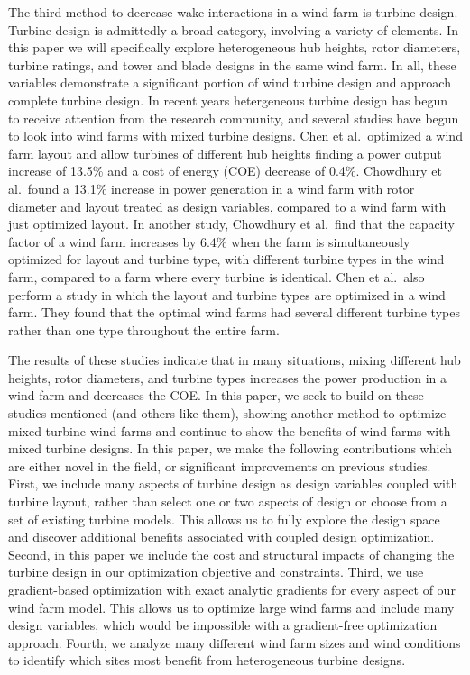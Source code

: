 The third method to decrease wake interactions in a wind farm is turbine design. Turbine design is admittedly a broad category, involving a variety of elements. In this paper we will specifically explore heterogeneous hub heights, rotor diameters, turbine ratings, and tower and blade designs in the same wind farm. In all, these variables demonstrate a significant portion of wind turbine design and approach complete turbine design. 
In recent years hetergeneous turbine design has begun to receive attention from the research community, and several studies have begun to look into wind farms with mixed turbine designs. Chen et al.~optimized
a wind farm layout and allow turbines of different hub heights finding a power output increase of 13.5\% and a cost of energy (COE) decrease of 0.4\%\cite{chen2013wind}. Chowdhury et al.~found
a 13.1\% increase in power generation in a wind farm with rotor diameter and layout treated as design variables, compared to a wind farm with just optimized layout\cite{chowdhury2010optimizing}. In another study, Chowdhury et al.~find that the capacity factor of a wind farm increases by 6.4\% when the farm is simultaneously optimized for layout and turbine type, with different turbine types in the wind farm, compared to a farm where every turbine is identical\cite{chowdhury2013optimizing}. Chen et al.~also perform a study in which the layout and turbine types are optimized in a wind farm. They found that the optimal wind farms had several different turbine types rather than one type throughout the entire farm\cite{chen2015multi}.

The results of these studies indicate that in many situations, mixing different hub heights, rotor diameters, and turbine types increases the power production in a wind farm and decreases the COE. In this paper, we seek to build on these studies mentioned (and others like them), showing another method to optimize mixed turbine wind farms and continue to show the benefits of wind farms with mixed turbine designs. In this paper, we make the following contributions which are either novel in the field, or significant improvements on previous studies.
First, we include many aspects of turbine design as design variables coupled with turbine layout, rather than select one or two aspects of design or choose from a set of existing turbine models. This allows us to fully explore the design space and discover additional benefits associated with coupled design optimization.
Second, in this paper we include the cost and structural impacts of changing the turbine design in our optimization objective and constraints.
Third, we use gradient-based optimization with exact analytic gradients for every aspect of our wind farm model. This allows us to optimize large wind farms and include many design variables, which would be impossible with a gradient-free optimization approach.
Fourth, we analyze many different wind farm sizes and wind conditions to identify which sites most benefit from heterogeneous turbine designs.



